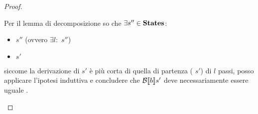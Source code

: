 {\begin{proof}
\begin{itemize}
             Per il lemma di decomposizione so che $\exists s''\in\mbox{\textbf{States}}$:
             \begin{itemize}
             \item {}  $s''$ (ovvero $\exists l:$
                 $s''$)
             \item {} \Rar{*} $s'$
             \end{itemize}
             siccome la derivazione di   $s'$ è più
             corta di quella di partenza (  $s'$)
             di $l$ passi, posso applicare l'ipotesi
             induttiva e concludere che $\mathcal{B} \llbracket b \rrbracket s'$ deve necessariamente essere
             uguale \semfalse.
             
            \end{itemize} 
           \end{proof}
         }
